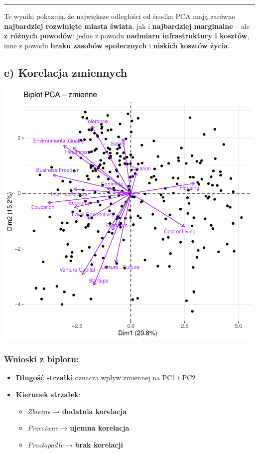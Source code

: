 \documentclass[
  12pt,
]{article}
\providecommand{\tightlist}{%
  \setlength{\itemsep}{0pt}\setlength{\parskip}{0pt}}
\begin{document}
\begin{center}\rule{0.5\linewidth}{0.5pt}\end{center}

Te wyniki pokazują, że największe odległości od środka PCA mają zarówno
\textbf{najbardziej rozwinięte miasta świata}, jak i \textbf{najbardziej
marginalne} -- ale \textbf{z różnych powodów}: jedne z powodu
\textbf{nadmiaru infrastruktury i kosztów}, inne z powodu \textbf{braku
zasobów społecznych} i \textbf{niskich kosztów życia}.

\subsection{e) Korelacja zmiennych}\label{e-korelacja-zmiennych}

\begin{center}\includegraphics{Sprawozdanie2_files/figure-latex/biplot_koniec-1} \end{center}

\subsubsection{Wnioski z biplotu:}\label{wnioski-z-biplotu}

\begin{itemize}
\tightlist
\item
  \textbf{Długość strzałki} oznacza wpływ zmiennej na PC1 i PC2
\item
  \textbf{Kierunek strzałek}:

  \begin{itemize}
  \tightlist
  \item
    \emph{Zbieżne} → \textbf{dodatnia korelacja}\\
  \item
    \emph{Przeciwne} → \textbf{ujemna korelacja}\\
  \item
    \emph{Prostopadłe} → \textbf{brak korelacji}
  \end{itemize}
\end{itemize}
\end{document}
